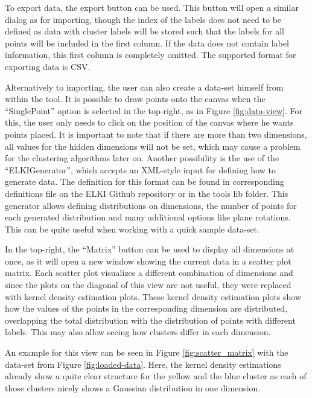 \documentclass[
	a4paper,
	english,
	twoside,
	openright,               
	11pt                            
	]{report}
\begin{document}
To export data, the export button can be used. This button will open a similar dialog as for importing, though the index of the labels does not need to be defined as data with cluster labels will be stored such that the labels for all points will be included in the first column. If the data does not contain label information, this first column is completely omitted. The supported format for exporting data is CSV.

Alternatively to importing, the user can also create a data-set himself from within the tool. It is possible to draw points onto the canvas when the ``SinglePoint'' option is selected in the top-right, as in Figure \ref{fig:data-view}. For this, the user only needs to click on the position of the canvas where he wants points placed. It is important to note that if there are more than two dimensions, all values for the hidden dimensions will not be set, which may cause a problem for the clustering algorithms later on. Another possibility is the use of the ``ELKIGenerator'', which accepts an XML-style input for defining how to generate data. The definition for this format can be found in corresponding definitions file on the ELKI Github repository \cite{elkixml} or in the tools lib folder. This generator allows defining distributions on dimensions, the number of points for each generated distribution and many additional options like plane rotations. This can be quite useful when working with a quick sample data-set. 

In the top-right, the ``Matrix'' button can be used to display all dimensions at once, as it will open a new window showing the current data in a scatter plot matrix. Each scatter plot visualizes a different combination of dimensions and since the plots on the diagonal of this view are not useful, they were replaced with kernel density estimation plots. These kernel density estimation plots show how the values of the points in the corresponding dimension are distributed, overlapping the total distribution with the distribution of points with different labels. This may also allow seeing how clusters differ in each dimension. 

An example for this view can be seen in Figure \ref{fig:scatter_matrix} with the data-set from Figure \ref{fig:loaded-data}. Here, the kernel density estimations already show a quite clear structure for the yellow and the blue cluster as each of those clusters nicely shows a Gaussian distribution in one dimension.
\end{document}
